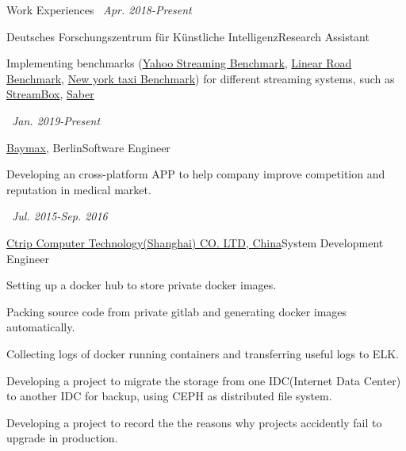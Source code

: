 \documentclass{resume} %
\begin{document}
\begin{rSection}{Work Experiences}
  {\ }\hfill{\em Apr. 2018-Present} \\ %
  \begin{rSubsection}{Deutsches Forschungszentrum für Künstliche Intelligenz}{}{Research Assistant}
  \item Implementing benchmarks (\href{https://github.com/yahoo/streaming-benchmarks}{Yahoo Streaming Benchmark}, \href{http://www.isys.ucl.ac.be/vldb04/eProceedings/contents/pdf/RS12P1.PDF}{Linear Road Benchmark}, \href{https://tech.marksblogg.com/benchmarks.html}{New york taxi Benchmark}) for different streaming systems, such as \href{https://www.usenix.org/system/files/conference/atc17/atc17-miao.pdf}{StreamBox}, \href{https://www.matthiasweidlich.com/paper/saber_SIGMOD_2016.pdf}{Saber}
  \end{rSubsection}

  {\ }\hfill{\em Jan. 2019-Present} \\
  \begin{rSubsection}{\href{http://www.baymax-group.com/}{Baymax}, Berlin}{}{Software Engineer}
  \item Developing an cross-platform APP to help company improve competition and reputation in medical market.
  \end{rSubsection}

  {\ }\hfill{\em Jul. 2015-Sep. 2016} \\
  \begin{rSubsection}{\href{https://www.trip.com/?locale=en-US}{Ctrip Computer Technology(Shanghai) CO. LTD, China}}{}{System Development Engineer}{}
  \item Setting up a docker hub to store private docker images.
  \item Packing source code from private gitlab and generating docker images automatically.
  \item Collecting logs of docker running containers and transferring useful logs to ELK.
  \item Developing a project to migrate the storage from one IDC(Internet Data Center) to another IDC for backup, using CEPH as distributed file system.
  \item Developing a project to record the the reasons why projects accidently fail to upgrade in production.
  \end{rSubsection}

\end{rSection}
\end{document}
